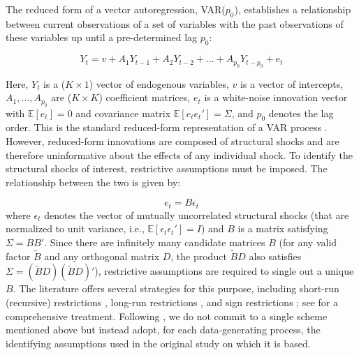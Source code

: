 \documentclass[12pt, a4paper]{article}
\begin{document}
The reduced form of a vector autoregression, VAR($p_0$), establishes a relationship between current observations of a set of variables with the past observations of these variables up until a pre-determined lag $p_0$:

\begin{equation} \label{eq:VAR}
    Y_t = v + A_{1}Y_{t-1}+A_2Y_{t-2}+...+A_{p_0}Y_{t-p_0}+e_t
\end{equation}

Here, $Y_t$ is a ($K \times 1$) vector of endogenous variables, $v$ is a vector of intercepts, $A_1, \dots, A_{p_0}$ are ($K \times K$) coefficient matrices, $e_t$ is a white-noise innovation vector with $\mathbb{E}[e_t] = 0$ and covariance matrix $\mathbb{E}[e_t e_t'] = \Sigma$, and $p_0$ denotes the lag order. This is the standard reduced-form representation of a VAR process \citep{lutkepohlNewIntroductionMultiple2005,simsMacroeconomicsReality1980}. However, reduced-form innovations are composed of structural shocks and are therefore uninformative about the effects of any individual shock. To identify the structural shocks of interest, restrictive assumptions must be imposed. The relationship between the two is given by:

\begin{equation} \label{eq:VAR_error}
    e_t = B \epsilon_t
\end{equation}
where $\epsilon_t$ denotes the vector of mutually uncorrelated structural shocks (that are normalized to unit variance, i.e., $\mathbb{E}[\epsilon_t \epsilon_t'] = I$) and $B$ is a matrix satisfying $\Sigma = BB'$. Since there are infinitely many candidate matrices $B$ (for any valid factor $\tilde{B}$ and any orthogonal matrix $D$, the product $\tilde{B} D$ also satisfies $\Sigma = (\tilde{B} D)(\tilde{B} D)'$), restrictive assumptions are required to single out a unique $B$. The literature offers several strategies for this purpose, including short-run (recursive) restrictions \citep{simsMacroeconomicsReality1980,christianoMonetaryPolicyShocks1999}, long-run restrictions \citep{blanchardDynamicEffectsAggregate1989}, and sign restrictions \citep{faustRobustnessIdentifiedVAR1998, uhligWhatAreEffects2005,rubio-ramirezStructuralVectorAutoregressions2010}; see \citet{kilianStructuralVectorAutoregressive2017} for a comprehensive treatment. Following \citet{ivanovPractitionersGuideLag2005}, we do not commit to a single scheme mentioned above but instead adopt, for each data-generating process, the identifying assumptions used in the original study on which it is based.
\end{document}
